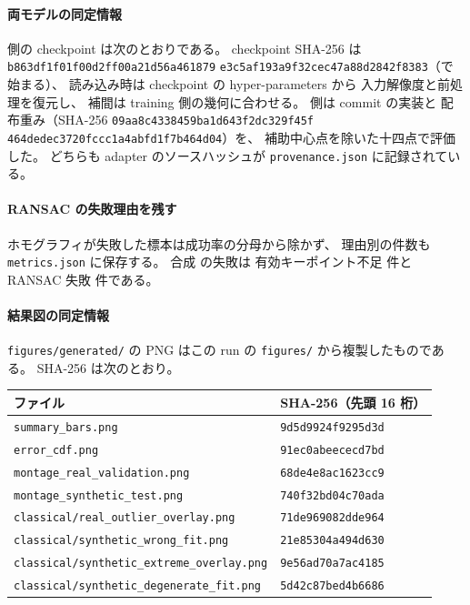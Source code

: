 \paragraph{両モデルの同定情報}
\Method 側の checkpoint は次のとおりである。
checkpoint SHA-256 は
\texttt{b863df1f01f00d2ff00a21d56a461879}\allowbreak
\texttt{e3c5af193a9f32cec47a88d2842f8383}（\resBenchOursCheckpointHashShort で始まる）、
読み込み時は checkpoint の hyper-parameters から
入力解像度と前処理を復元し、
補間は training 側の幾何に合わせる。
\BaselineShort 側は commit \BaselineCommit の実装と
配布重み（SHA-256 \texttt{09aa8c4338459ba1d643f2dc329f45f}\allowbreak
\texttt{464dedec3720fccc1a4abfd1f7b464d04}）を、
補助中心点を除いた十四点で評価した。
どちらも adapter のソースハッシュが
\texttt{provenance.json} に記録されている。

\paragraph{RANSAC の失敗理由を残す}
ホモグラフィが失敗した標本は成功率の分母から除かず、
理由別の件数も \texttt{metrics.json} に保存する。
合成 \BaselineShort の失敗は
有効キーポイント不足 \resSynthTcdInsufficientFailures 件と
RANSAC 失敗 \resSynthTcdRansacFailures 件である。

\paragraph{結果図の同定情報}
\texttt{figures/generated/} の PNG はこの run の
\texttt{figures/} から複製したものである。
SHA-256 は次のとおり。

\begin{center}
  \small
  \begin{tabular}{@{}ll@{}}
    \toprule
    ファイル & SHA-256（先頭 16 桁） \\
    \midrule
    \texttt{summary\_bars.png} & \texttt{9d5d9924f9295d3d} \\
    \texttt{error\_cdf.png} & \texttt{91ec0abeececd7bd} \\
    \texttt{montage\_real\_validation.png} & \texttt{68de4e8ac1623cc9} \\
    \texttt{montage\_synthetic\_test.png} & \texttt{740f32bd04c70ada} \\
    \midrule
    \texttt{classical/real\_outlier\_overlay.png} & \texttt{71de969082dde964} \\
    \texttt{classical/synthetic\_wrong\_fit.png} & \texttt{21e85304a494d630} \\
    \texttt{classical/synthetic\_extreme\_overlay.png} & \texttt{9e56ad70a7ac4185} \\
    \texttt{classical/synthetic\_degenerate\_fit.png} & \texttt{5d42c87bed4b6686} \\
    \bottomrule
  \end{tabular}
\end{center}

